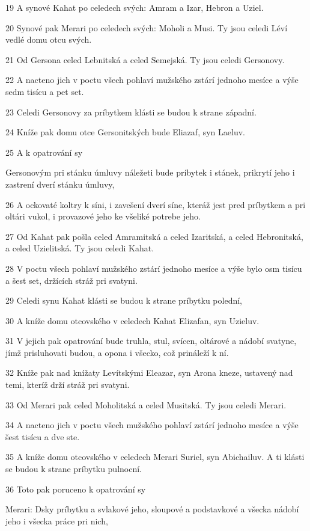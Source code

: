 \par 19 A synové Kahat po celedech svých: Amram a Izar, Hebron a Uziel.
\par 20 Synové pak Merari po celedech svých: Moholi a Musi. Ty jsou celedi Léví vedlé domu otcu svých.
\par 21 Od Gersona celed Lebnitská a celed Semejská. Ty jsou celedi Gersonovy.
\par 22 A nacteno jich v poctu všech pohlaví mužského zstárí jednoho mesíce a výše sedm tisícu a pet set.
\par 23 Celedi Gersonovy za príbytkem klásti se budou k strane západní.
\par 24 Kníže pak domu otce Gersonitských bude Eliazaf, syn Laeluv.
\par 25 A k opatrování sy\par Gersonovým pri stánku úmluvy náležeti bude príbytek i stánek, prikrytí jeho i zastrení dverí stánku úmluvy,
\par 26 A ockovaté koltry k síni, i zavešení dverí síne, kteráž jest pred príbytkem a pri oltári vukol, i provazové jeho ke všeliké potrebe jeho.
\par 27 Od Kahat pak pošla celed Amramitská a celed Izaritská, a celed Hebronitská, a celed Uzielitská. Ty jsou celedi Kahat.
\par 28 V poctu všech pohlaví mužského zstárí jednoho mesíce a výše bylo osm tisícu a šest set, držících stráž pri svatyni.
\par 29 Celedi synu Kahat klásti se budou k strane príbytku polední,
\par 30 A kníže domu otcovského v celedech Kahat Elizafan, syn Uzieluv.
\par 31 V jejich pak opatrování bude truhla, stul, svícen, oltárové a nádobí svatyne, jímž prisluhovati budou, a opona i všecko, což prináleží k ní.
\par 32 Kníže pak nad knížaty Levítskými Eleazar, syn Arona kneze, ustavený nad temi, kteríž drží stráž pri svatyni.
\par 33 Od Merari pak celed Moholitská a celed Musitská. Ty jsou celedi Merari.
\par 34 A nacteno jich v poctu všech mužského pohlaví zstárí jednoho mesíce a výše šest tisícu a dve ste.
\par 35 A kníže domu otcovského v celedech Merari Suriel, syn Abichailuv. A ti klásti se budou k strane príbytku pulnocní.
\par 36 Toto pak poruceno k opatrování sy\par Merari: Dsky príbytku a svlakové jeho, sloupové a podstavkové a všecka nádobí jeho i všecka práce pri nich,
